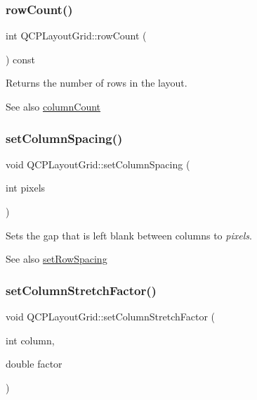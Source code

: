 \subsubsection{\texorpdfstring{row\+Count()}{rowCount()}}
{\footnotesize\ttfamily int Q\+C\+P\+Layout\+Grid\+::row\+Count (\begin{DoxyParamCaption}{ }\end{DoxyParamCaption}) const\hspace{0.3cm}{\ttfamily [inline]}}

Returns the number of rows in the layout.

\begin{DoxySeeAlso}{See also}
\hyperlink{class_q_c_p_layout_grid_a1a2962cbf45011405b64b913afa8e7a2}{column\+Count} 
\end{DoxySeeAlso}
\mbox{\label{class_q_c_p_layout_grid_a3a49272aba32bb0fddc3bb2a45a3dba0}} 
\subsubsection{\texorpdfstring{set\+Column\+Spacing()}{setColumnSpacing()}}
{\footnotesize\ttfamily void Q\+C\+P\+Layout\+Grid\+::set\+Column\+Spacing (\begin{DoxyParamCaption}\item[{int}]{pixels }\end{DoxyParamCaption})}

Sets the gap that is left blank between columns to {\itshape pixels}.

\begin{DoxySeeAlso}{See also}
\hyperlink{class_q_c_p_layout_grid_aaef2cd2d456197ee06a208793678e436}{set\+Row\+Spacing} 
\end{DoxySeeAlso}
\mbox{\label{class_q_c_p_layout_grid_ae38f31a71687b9d7ee3104852528fb50}} 
\subsubsection{\texorpdfstring{set\+Column\+Stretch\+Factor()}{setColumnStretchFactor()}}
{\footnotesize\ttfamily void Q\+C\+P\+Layout\+Grid\+::set\+Column\+Stretch\+Factor (\begin{DoxyParamCaption}\item[{int}]{column,  }\item[{double}]{factor }\end{DoxyParamCaption})}

